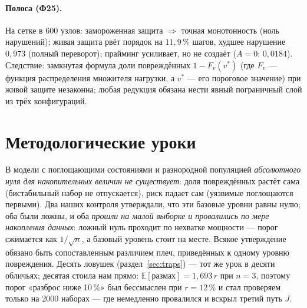 \documentclass[11pt,a4paper]{article}
\theoremstyle{remark}
\begin{document}
\paragraph{Полоса (Ф25).} На сетке в 600 узлов: замороженная защита $\Rightarrow$
точная монотонность (ноль нарушений); живая защита рвёт порядок на $11{,}9$\,\% шагов,
худшее нарушение $0{,}973$ (полный переворот); прайминг усиливает, но не создаёт
($A=0$: $0{,}0184$). Следствие: замкнутая формула доли повреждённых $1-F_v(v^*)$ (где $F_v$ --- функция
распределения множителя нагрузки, а $v^*$ --- его пороговое значение) при живой защите
незаконна; любая редукция обязана нести явный пограничный слой из трёх конфигураций.

\section{Методологические уроки}\label{sec:lessons}
В модели с поглощающими состояниями и разнородной популяцией \emph{абсолютного нуля
для накопительных величин не существует}: доля повреждённых растёт сама (бистабильный
набор не отпускается), риск падает сам (уязвимые поглощаются первыми). Два наших
контроля утверждали, что эти базовые уровни равны нулю; оба были ложны, и оба \emph{прошли на
малой выборке и провалились по мере накопления данных}: ложный нуль проходит по
нехватке мощности --- порог сжимается как $1/\sqrt{n}$, а базовый уровень стоит на
месте. Всякое
утверждение обязано быть сопоставленным различием плеч, приведённых к одному уровню
повреждения. Десять ловушек (раздел~\ref{sec:traps}) --- тот же урок в десяти обличьях; десятая стоила
нам прямо: $\mathbb{E}[\text{размах}]=1{,}693\,r$ при $n=3$, поэтому порог «разброс ниже
10\,\%» был бессмыслен при $r=12$\,\% и стал проверяем только на 2000 наборах --- где
немедленно провалился и вскрыл третий путь $J$.
\end{document}
